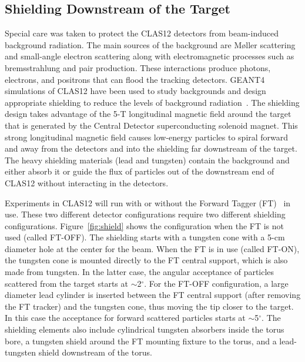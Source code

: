 \subsection{Shielding Downstream of the Target} 

Special care was taken to protect the CLAS12 detectors from beam-induced background radiation. The main sources
of the background are M{\o}ller scattering and small-angle electron scattering along with electromagnetic processes
such as bremsstrahlung and pair production. These interactions produce photons, electrons, and positrons that can
flood the tracking detectors. GEANT4 simulations of CLAS12 have been used to study backgrounds and design
appropriate shielding to reduce the levels of background radiation~\cite{sim-nim}. The shielding design takes
advantage of the 5-T longitudinal magnetic field around the target that is generated by the Central Detector
superconducting solenoid magnet. This strong longitudinal magnetic field causes low-energy particles to spiral
forward and away from the detectors and into the shielding far downstream of the target. The heavy shielding
materials (lead and tungsten) contain the background and either absorb it or guide the flux of particles out of the
downstream end of CLAS12 without interacting in the detectors. 

Experiments in CLAS12 will run with or without the Forward Tagger (FT)~\cite{ft-nim} in use. These two different
detector configurations require two different shielding configurations. Figure~\ref{fig:shield} shows the
configuration when the FT is not used (called FT-OFF). The shielding starts with a tungsten cone with a 5-cm
diameter hole at the center for the beam. When the FT is in use (called FT-ON), the tungsten cone is mounted
directly to the FT central support, which is also made from tungsten. In the latter case, the angular acceptance
of particles scattered from the target starts at $\sim$2$^\circ$. For the FT-OFF configuration, a large diameter
lead cylinder is inserted between the FT central support (after removing the FT tracker) and the tungsten cone,
thus moving the tip closer to the target. In this case the acceptance for forward scattered particles starts at
$\sim$5$^\circ$. The shielding elements also include cylindrical tungsten absorbers inside the torus bore, a
tungsten shield around the FT mounting fixture to the torus, and a lead-tungsten shield downstream of the torus.  

